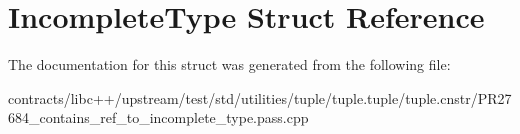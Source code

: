 \hypertarget{struct_incomplete_type}{}\section{Incomplete\+Type Struct Reference}
\label{struct_incomplete_type}


The documentation for this struct was generated from the following file\+:\begin{DoxyCompactItemize}
\item 
contracts/libc++/upstream/test/std/utilities/tuple/tuple.\+tuple/tuple.\+cnstr/P\+R27684\+\_\+contains\+\_\+ref\+\_\+to\+\_\+incomplete\+\_\+type.\+pass.\+cpp\end{DoxyCompactItemize}
